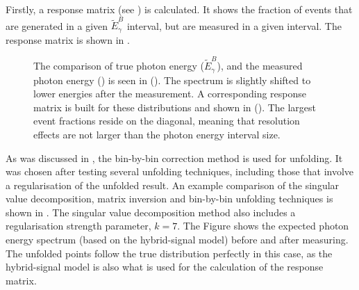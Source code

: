 Firstly, a response matrix (see ) is calculated.
It shows the fraction of events that are generated in a given $\tilde{E}_{\gamma}^B$ interval, but are measured in a given \EB interval.
The response matrix is shown in .

\begin{figure}[hbtp!]
    \centering
    \caption{\label{fig:unfolding_setup} The comparison of true photon energy ($\tilde{E}_{\gamma}^B$),
    and the measured photon energy (\EB) is seen in ().
    The spectrum is slightly shifted to lower energies after the measurement.
    A corresponding response matrix is built for these distributions and shown in ().
    The largest \BtoXsgamma event fractions reside on the diagonal, meaning that resolution effects are not larger than the photon energy interval size.
    }
\end{figure}

As was discussed in , the bin-by-bin correction method is used for unfolding.
It was chosen after testing several unfolding techniques, including those that involve a regularisation of the unfolded result.
An example comparison of the singular value decomposition, matrix inversion and bin-by-bin unfolding techniques is shown in .
The singular value decomposition method also includes a regularisation strength parameter, $k=7$.
The Figure shows the expected \BtoXsgamma photon energy spectrum (based on the hybrid-signal model) before and after measuring.
The unfolded points follow the true distribution perfectly in this case, as the hybrid-signal model is also what is used for the calculation of the response matrix.

